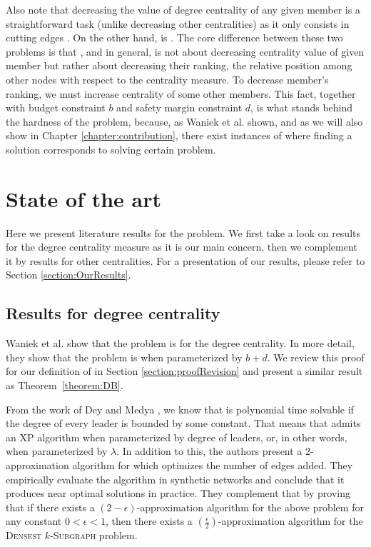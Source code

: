 Also note that decreasing the value of degree centrality of any given member is a straightforward task
(unlike decreasing other centralities) as it only consists in cutting edges \cite{Waniek2016}.
On the other hand, \HLdeg is \NPc \cite{Waniek2017}.
The core difference between these two problems is that \HLdeg, and \HLshort in general,
is not about decreasing centrality value of given member but rather about decreasing their ranking,
the relative position among other nodes with respect to the centrality measure.
To decrease member's ranking, we must increase centrality of some other members.
This fact, together with budget constraint $b$ and safety margin constraint $d$,
is what stands behind the hardness of the \HL problem, because,
as Waniek et al. \cite{Waniek2017} shown, and as we will also show in Chapter \ref{chapter:contribution},
there exist instances of \HLshort where finding a solution corresponds to solving certain \NPh problem.


\section{State of the art}

Here we present literature results for the \HL problem.
We first take a look on results for the degree centrality measure as it is our main concern, then we
complement it by results for other centralities.
For a presentation of our results, please refer to Section \ref{section:OurResults}.


\subsection{Results for degree centrality}\label{subsection:ResultsDegree}

Waniek et al. \cite{Waniek2017} show that the \HL problem is \NPc for the degree centrality.
In more detail, they show that the problem is \Wh when parameterized by $b+d$.
We review this proof for our definition of \HLshort in Section \ref{section:proofRevision} and present
a similar result as Theorem~\ref{theorem:DB}.

From the work of Dey and Medya \cite{Dey2019}, we know that \HLdeg is polynomial time solvable
if the degree of every leader is bounded by some constant.
That means that \HLdeg admits an XP algorithm when parameterized by degree of leaders, or,
in other words, when parameterized by $\lambda$.
In addition to this, the authors present a $2$-approximation algorithm for \HLdeg which optimizes
the number of edges added.
They empirically evaluate the algorithm in synthetic networks and conclude that it produces near
optimal solutions in practice.
They complement that by proving that if there exists a $(2-\epsilon)$-approximation algorithm
for the above problem for any constant $0 < \epsilon < 1$, then there exists
a $(\frac{\epsilon}{2})$-approximation algorithm for the \textsc{Densest} $k$-\textsc{Subgraph} problem.


